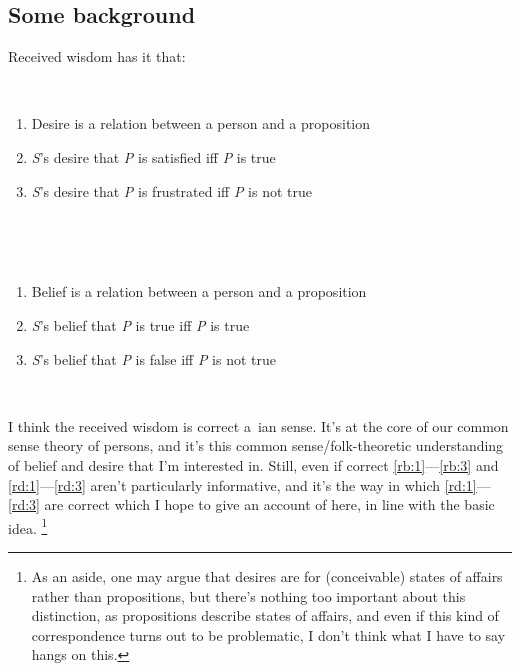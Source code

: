 \documentclass[10pt]{article}
\begin{document}
\subsection{Some background}
\label{sec:some-background}

Received wisdom has it that:

\begin{minipage}{0.45\linewidth}\mbox{ }
  \begin{enumerate}[labelindent=\parindent,leftmargin=*,label=(RB\arabic*)]
  \item\label{rd:1} Desire is a relation between a person and a proposition
  \item\label{rd:2} \emph{S}’s desire that \emph{P} is satisfied iff \emph{P} is true
  \item\label{rd:3} \emph{S}’s desire that \emph{P} is frustrated iff \emph{P} is not true
  \end{enumerate}\mbox{ }
\end{minipage}\hfill
\begin{minipage}{0.45\linewidth}\mbox{ }
  \begin{enumerate}[labelindent=\parindent,leftmargin=*,label=(RD\arabic*)]
  \item\label{rb:1} Belief is a relation between a person and a proposition
  \item\label{rb:2} \emph{S}’s belief that \emph{P} is true iff \emph{P} is true
  \item\label{rb:3} \emph{S}’s belief that \emph{P} is false iff \emph{P} is not true
  \end{enumerate}\mbox{ }
\end{minipage}

I think the received wisdom is correct a~\citeauthor{Lewis:1974aa}ian sense.
It's at the core of our common sense theory of persons, and it's this common sense/folk-theoretic understanding of belief and desire that I'm interested in.
Still, even if correct \ref{rb:1}---\ref{rb:3} and \ref{rd:1}---\ref{rd:3} aren't particularly informative, and it's the way in which \ref{rd:1}---\ref{rd:3} are correct which I hope to give an account of here, in line with the basic idea.\nolinebreak
\footnote{As an aside, one may argue that desires are for (conceivable) states of affairs rather than propositions, but there's nothing too important about this distinction, as propositions describe states of affairs, and even if this kind of correspondence turns out to be problematic, I don't think what I have to say hangs on this.}
\end{document}
